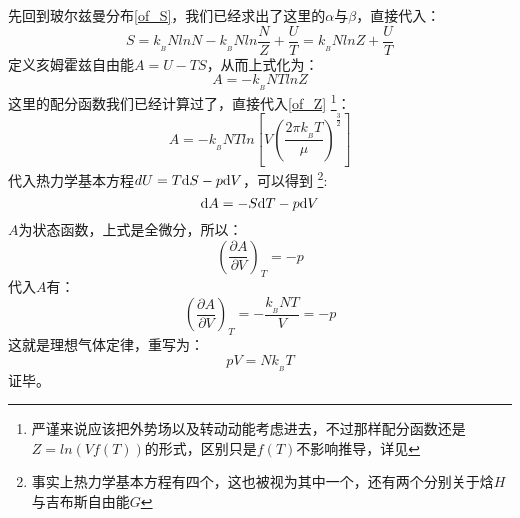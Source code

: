\documentclass{Physics_H_Notes}
\begin{document}
        \begin{prove}
            先回到玻尔兹曼分布\ref{of_S}，我们已经求出了这里的$\alpha$与$\beta$，直接代入：
            \begin{equation}
                S = k_{_B}NlnN - k_{_B}Nln\frac{N}{Z} + \frac{U}{T} = k_{_B}NlnZ + \frac{U}{T}
            \end{equation}
            定义亥姆霍兹自由能$A=U-TS$，从而上式化为：
            \begin{equation}
                A = -k_{_B}NTlnZ
            \end{equation}
            这里的配分函数我们已经计算过了，直接代入\ref{of_Z}
            \footnote{严谨来说应该把外势场以及转动动能考虑进去，不过那样配分函数还是$Z=ln(Vf(T))$的形式，区别只是$f(T)$不影响推导，详见}：
            \begin{equation}
                A = -k_{_B}NTln\left[V\left(\frac{2\pi k_{_B}T}{\mu}\right)^{\frac{3}{2}}\right]
                \label{of_A}
            \end{equation}
            代入热力学基本方程$dU=T\mathrm{d}{S}-p\mathrm{d}{V}$，可以得到
            \footnote{事实上热力学基本方程有四个，这也被视为其中一个，还有两个分别关于焓$H$与吉布斯自由能$G$}:
            \begin{equation}
                \mathrm{d}{A} = -S\mathrm{d}{T} - p\mathrm{d}{V}
                \label{of_dif_A}
            \end{equation}
            $A$为状态函数，上式是全微分，所以：
            \begin{equation}
                \left(\frac{\partial A}{\partial V}\right)_{T} = -p
            \end{equation}
            代入$A$有：
            \begin{equation}
                \left(\frac{\partial A}{\partial V}\right)_{T} = -\frac{k_{_B}NT}{V} =-p
            \end{equation}
            这就是理想气体定律，重写为：
            \begin{equation}
                pV = Nk_{_B}T
            \end{equation}
            证毕。
        \end{prove}
\end{document}
